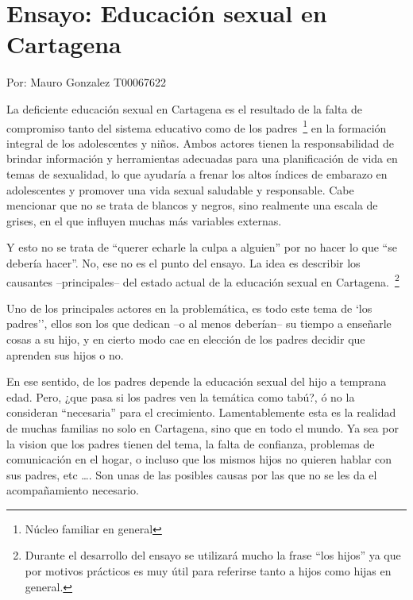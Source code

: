 \documentclass[letterpaper, 12pt]{article}
\begin{document}
\section*{Ensayo: Educación sexual en Cartagena}

\noindent\makebox[\linewidth]{\rule{\textwidth}{0.4pt}}

Por: Mauro Gonzalez T00067622

\noindent\makebox[\linewidth]{\rule{\textwidth}{0.4pt}}

\bigskip


La deficiente educación sexual en Cartagena es el resultado
de la falta de compromiso tanto del sistema educativo como
de los padres~\footnote{Núcleo familiar en general} en la
formación integral de los adolescentes y niños. Ambos
actores tienen la responsabilidad de brindar información y
herramientas adecuadas para una planificación de vida en
temas de sexualidad, lo que ayudaría a frenar los altos
índices de embarazo en adolescentes y promover una vida
sexual saludable y responsable. Cabe mencionar que no se
trata de blancos y negros, sino realmente una escala de
grises, en el que influyen muchas más variables externas.

Y esto no se trata de ``querer echarle la culpa a alguien''
por no hacer lo que ``se debería hacer''. No, ese no es el
punto del ensayo. La idea es describir los causantes
--principales-- del estado actual de la educación sexual en
Cartagena.~\footnote{Durante el desarrollo del ensayo se
    utilizará mucho la frase ``los hijos'' ya que por motivos
    prácticos es muy útil para referirse tanto a hijos como
    hijas en general.}


Uno de los principales actores en la problemática, es todo
este tema de `los padres'', ellos son los que dedican --o
al menos deberían-- su tiempo a enseñarle cosas a su hijo,
y en cierto modo cae en elección de los padres decidir que
aprenden sus hijos o no.

En ese sentido, de los padres depende la educación sexual
del hijo a temprana edad. Pero, ¿que pasa si los padres ven
la temática como tabú?, ó no la consideran ``necesaria''
para el crecimiento. Lamentablemente esta es la realidad de
muchas familias no solo en Cartagena, sino que en todo el
mundo. Ya sea por la vision que los padres tienen del tema,
la falta de confianza, problemas de comunicación en el
hogar, o incluso que los mismos hijos no quieren hablar con
sus padres, etc \dots. Son unas de las posibles causas por
las que no se les da el acompañamiento necesario.
\end{document}
